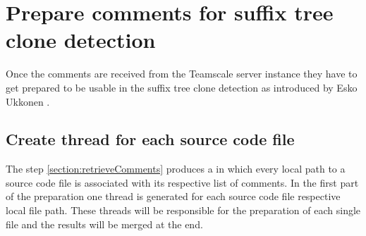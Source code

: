 


\section{Prepare comments for suffix tree clone detection}
Once the comments are received from the Teamscale server instance they have to get prepared to be usable in the suffix tree clone detection as introduced by Esko Ukkonen \cite{Ukkonen1995}\cite{Ukkonen1993}.\\
\subsection{Create thread for each source code file}
The step \ref{section:retrieveComments} produces a  in which every local path to a source code file is associated with its respective list of comments.
In the first part of the preparation one thread is generated for each source code file respective local file path. These threads will be responsible for the preparation of each single file and the results will be merged at the end.

